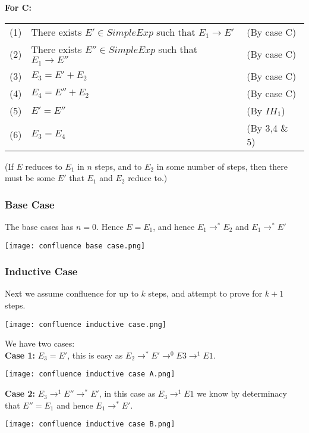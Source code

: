 \documentclass{report}
\begin{document}
\textbf{For C:}
\begin{center}
	\begin{tabular}{l l l}
		(1) & There exists $E' \in SimpleExp$ such that $E_1 \to E'$   & (By case C)   \\
		(2) & There exists $E'' \in SimpleExp$ such that $E_1 \to E''$ & (By case C)   \\
		(3) & $E_3 = E' + E_2$                                         & (By case C)   \\
		(4) & $E_4 = E'' + E_2$                                        & (By case C)   \\
		(5) & $E' = E''$                                               & (By $IH_1$)   \\
		(6) & $E_3 = E_4$                                              & (By 3,4 \& 5)
	\end{tabular}
\end{center}
(If $E$ reduces to $E_1$ in $n$ steps, and to $E_2$ in some number of steps, then there must be some $E'$ that $E_1$ and $E_2$ reduce to.)
\subsubsection*{Base Case}
The base cases has $n=0$. Hence $E = E_1$, and hence $E_1 \to^* E_2$ and $E_1 \to^* E'$
\begin{center}
	\texttt{[image: confluence base case.png]}
\end{center}
\subsubsection*{Inductive Case}
Next we assume confluence for up to $k$ steps, and attempt to prove for $k+1$ steps.
\begin{center}
	\texttt{[image: confluence inductive case.png]}
\end{center}
We have two cases:
\\ \textbf{Case 1:} $E_3 = E'$, this is easy as $E_2 \to^* E' \to^0 E3 \to^1 E1$.
\begin{center}
	\texttt{[image: confluence inductive case A.png]}
\end{center}
\textbf{Case 2:} $E_3 \to^1 E'' \to^* E'$, in this case as $E_3 \to^1 E1$ we know by determinacy that $E'' = E_1$ and hence $E_1 \to^* E'$.
\begin{center}
	\texttt{[image: confluence inductive case B.png]}
\end{center}
\end{document}
